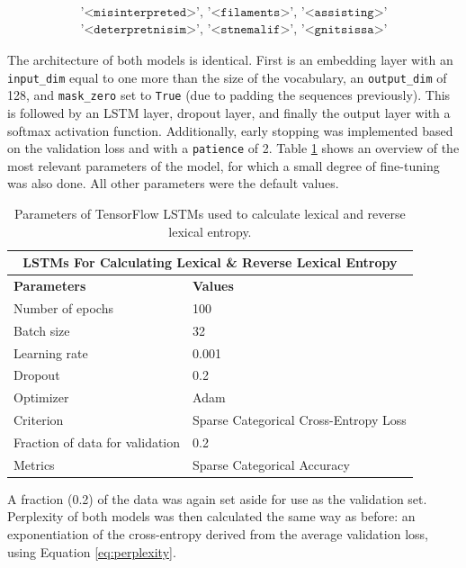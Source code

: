 \documentclass[12pt,a4paper]{article}
\numberwithin{figure}{section}
\numberwithin{table}{section}
\numberwithin{definition}{section}
\begin{document}
\begin{align}
\texttt{'<misinterpreted>', '<filaments>', '<assisting>'} \label{lexentropyseq1} \\
\texttt{'<deterpretnisim>', '<stnemalif>', '<gnitsissa>'} \label{lexentropyseq2}
\end{align}

The architecture of both models is identical. First is an embedding layer with an \texttt{input\_dim} equal to one more than the size of the vocabulary, an \texttt{output\_dim} of 128, and \texttt{mask\_zero} set to \texttt{True} (due to padding the sequences previously). This is followed by an LSTM layer, dropout layer, and finally the output layer with a softmax activation function. Additionally, early stopping was implemented based on the validation loss and with a \texttt{patience} of 2. Table \ref{tbl:keraslstmparams} shows an overview of the most relevant parameters of the model, for which a small degree of fine-tuning was also done. All other parameters were the default values.

\begin{table}[!h] 
  \centering\small
  \renewcommand{\arraystretch}{1.5} 
  \begin{tabular}{@{}ll@{}}
  \hline
  \multicolumn{2}{|c|}{\textbf{LSTMs For Calculating Lexical \& Reverse Lexical Entropy}} \\
  \hline
  \textbf{Parameters} & \textbf{Values} \\
  \hline
  Number of epochs & 100 \\
  Batch size & 32 \\
  Learning rate & 0.001 \\
  Dropout & 0.2 \\
  Optimizer & Adam \\
  Criterion & Sparse Categorical Cross-Entropy Loss \\
  Fraction of data for validation & 0.2 \\
  Metrics & Sparse Categorical Accuracy \\
  \hline
  \end{tabular}
  \caption{Parameters of TensorFlow LSTMs used to calculate lexical and reverse lexical entropy.}
  \label{tbl:keraslstmparams}
\end{table}

A fraction (0.2) of the data was again set aside for use as the validation set. Perplexity of both models was then calculated the same way as before: an exponentiation of the cross-entropy derived from the average validation loss, using Equation \ref{eq:perplexity}.
\end{document}
